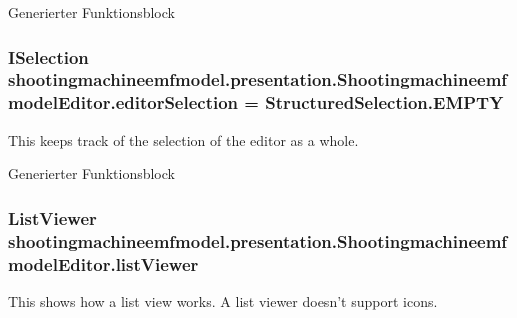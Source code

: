Generierter Funktionsblock \hypertarget{classshootingmachineemfmodel_1_1presentation_1_1_shootingmachineemfmodel_editor_aec839fd79b2747a2d021c15cbafbdd08}{
\subsubsection[{editor\-Selection}]{\setlength{\rightskip}{0pt plus 5cm}I\-Selection shootingmachineemfmodel.\-presentation.\-Shootingmachineemfmodel\-Editor.\-editor\-Selection = Structured\-Selection.\-E\-M\-P\-T\-Y\hspace{0.3cm}{\ttfamily [protected]}}}\label{classshootingmachineemfmodel_1_1presentation_1_1_shootingmachineemfmodel_editor_aec839fd79b2747a2d021c15cbafbdd08}
This keeps track of the selection of the editor as a whole.

Generierter Funktionsblock \hypertarget{classshootingmachineemfmodel_1_1presentation_1_1_shootingmachineemfmodel_editor_a7e795c2feed14cb78a111857e5073881}{
\subsubsection[{list\-Viewer}]{\setlength{\rightskip}{0pt plus 5cm}List\-Viewer shootingmachineemfmodel.\-presentation.\-Shootingmachineemfmodel\-Editor.\-list\-Viewer\hspace{0.3cm}{\ttfamily [protected]}}}\label{classshootingmachineemfmodel_1_1presentation_1_1_shootingmachineemfmodel_editor_a7e795c2feed14cb78a111857e5073881}
This shows how a list view works. A list viewer doesn't support icons.

